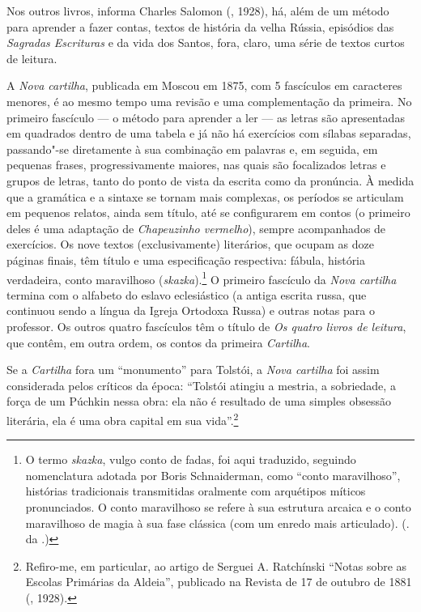 Nos outros livros, informa Charles Salomon (,
1928), há, além de um método para aprender a fazer contas, textos
de história da velha Rússia, episódios das \emph{Sagradas
Escrituras} e da vida dos Santos, fora, claro, uma série de
textos curtos de leitura.

A \emph{Nova cartilha}, publicada em Moscou em 1875, com 5
fascículos em caracteres menores, é ao mesmo tempo uma revisão
e uma complementação da primeira. No primeiro fascículo --- o
método para aprender a ler --- as letras são apresentadas em
quadrados dentro de uma tabela e já não há exercícios com
sílabas separadas, passando"-se diretamente à sua combinação
em palavras e, em seguida, em pequenas frases, progressivamente maiores, nas quais são focalizados
letras e grupos de letras, tanto do ponto de vista da escrita
como da pronúncia. À medida que a gramática e a sintaxe se
tornam mais complexas, os períodos se articulam em pequenos
relatos, ainda sem título, até se configurarem em contos (o
primeiro deles é uma adaptação de \emph{Chapeuzinho vermelho}),
sempre acompanhados de exercícios. Os nove textos (exclusivamente)
literários, que ocupam as doze páginas finais, têm título e uma
especificação respectiva: fábula, história verdadeira, conto
maravilhoso (\emph{skazka}).\footnote{O termo \emph{skazka}, vulgo conto de fadas, foi aqui traduzido, seguindo nomenclatura adotada por Boris Schnaiderman, como ``conto maravilhoso'', histórias tradicionais transmitidas oralmente com arquétipos míticos pronunciados. O conto maravilhoso se refere à sua estrutura arcaica e o conto maravilhoso de magia à sua fase clássica (com um enredo mais articulado). (. da .)} O primeiro fascículo da \emph{Nova
cartilha} termina com o alfabeto do eslavo eclesiástico (a antiga
escrita russa, que continuou sendo a língua da Igreja Ortodoxa
Russa) e outras notas para o professor. Os outros quatro
fascículos têm o título de \emph{Os quatro livros de leitura},
que contêm, em outra ordem, os contos da primeira \emph{Cartilha}.

Se a \emph{Cartilha} fora um ``monumento'' para Tolstói, a \emph{Nova
cartilha} foi assim considerada pelos críticos da época: ``Tolstói
atingiu a mestria, a sobriedade, a força de um Púchkin nessa obra:
ela não é resultado de uma simples obsessão literária, ela é uma
obra capital em sua vida''.\footnote{Refiro-me, em particular,
ao artigo de Serguei A. Ratchínski ``Notas sobre as Escolas
Primárias da Aldeia'', publicado na Revista  de 17
de outubro de 1881 (, 1928).}

